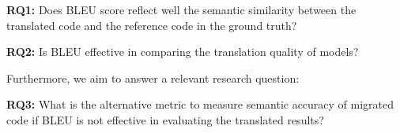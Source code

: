 {\bf RQ1:} Does BLEU score reflect well the semantic similarity between
the translated code and the reference code in the ground truth?

{\bf RQ2:} Is BLEU effective in comparing the translation quality of models?


Furthermore, we aim to answer a relevant research question:

{\bf RQ3:} What is the alternative metric to measure semantic accuracy
of migrated code if BLEU is not effective in evaluating the translated results?
